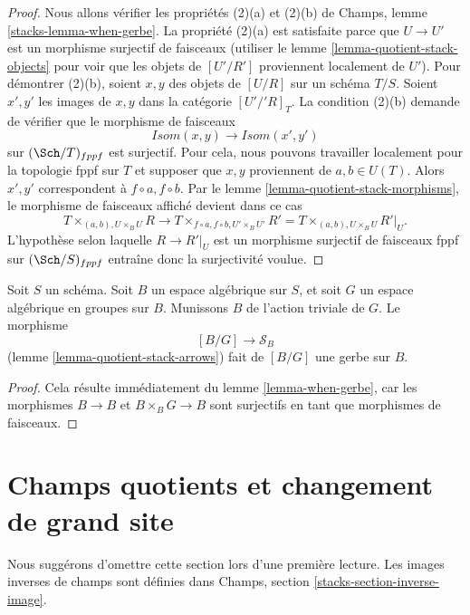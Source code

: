 \begin{proof}
Nous allons vérifier les propriétés (2)(a) et (2)(b) de Champs, lemme
\ref{stacks-lemma-when-gerbe}. La propriété (2)(a) est satisfaite parce que
$U \to U'$ est un morphisme surjectif de faisceaux (utiliser le lemme
\ref{lemma-quotient-stack-objects} pour voir que les objets de $[U'/R']$
proviennent localement de $U'$). Pour démontrer (2)(b), soient $x, y$ des
objets de $[U/R]$ sur un schéma $T/S$. Soient $x', y'$ les images de $x, y$
dans la catégorie $[U'/'R]_T$. La condition (2)(b) demande de vérifier que
le morphisme de faisceaux
$$
\mathit{Isom}(x, y) \longrightarrow \mathit{Isom}(x', y')
$$
sur $(\Sch/T)_{fppf}$ est surjectif. Pour cela, nous pouvons travailler
localement pour la topologie fppf sur $T$ et supposer que $x, y$ proviennent
de $a, b \in U(T)$. Alors $x', y'$ correspondent à
$f \circ a, f \circ b$. Par le lemme
\ref{lemma-quotient-stack-morphisms}, le morphisme de faisceaux affiché
devient dans ce cas
$$
T \times_{(a, b), U \times_B U} R
\longrightarrow
T \times_{f \circ a, f \circ b, U' \times_B U'} R' =
T \times_{(a, b), U \times_B U} R'|_U.
$$
L'hypothèse selon laquelle $R \to R'|_U$ est un morphisme surjectif de
faisceaux fppf sur $(\Sch/S)_{fppf}$ entraîne donc la surjectivité voulue.
\end{proof}

\begin{lemma}
\label{lemma-group-quotient-gerbe}
Soit $S$ un schéma. Soit $B$ un espace algébrique sur $S$, et soit $G$ un
espace algébrique en groupes sur $B$. Munissons $B$ de l'action triviale de
$G$. Le morphisme
$$
[B/G] \longrightarrow \mathcal{S}_B
$$
(lemme \ref{lemma-quotient-stack-arrows}) fait de $[B/G]$ une gerbe sur $B$.
\end{lemma}

\begin{proof}
Cela résulte immédiatement du lemme \ref{lemma-when-gerbe}, car les
morphismes $B \to B$ et $B \times_B G \to B$ sont surjectifs en tant que
morphismes de faisceaux.
\end{proof}








\section{Champs quotients et changement de grand site}
\label{section-bigger-site}

\noindent
Nous suggérons d'omettre cette section lors d'une première lecture. Les images
inverses de champs sont définies dans Champs, section
\ref{stacks-section-inverse-image}.

